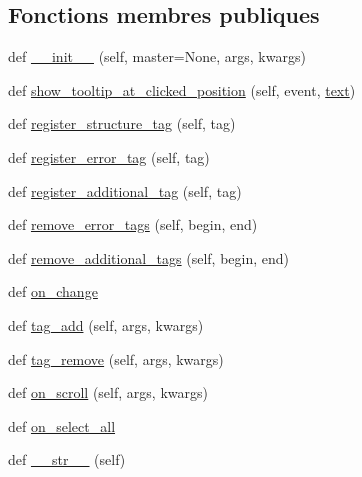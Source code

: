\subsection*{Fonctions membres publiques}
\begin{DoxyCompactItemize}
\item 
def \hyperlink{classtex__editor_1_1utils_1_1_special_text_ab5ce5add457b9d87567d9e406e0e0d7f}{\+\_\+\+\_\+init\+\_\+\+\_\+} (self, master=None, args, kwargs)
\item 
def \hyperlink{classtex__editor_1_1utils_1_1_special_text_ac86588cdecd42ba520da540c3b53054c}{show\+\_\+tooltip\+\_\+at\+\_\+clicked\+\_\+position} (self, event, \hyperlink{namespacetex__editor_1_1utils_ae4fa308d3c65a5223578baf4c1ec4ddd}{text})
\item 
def \hyperlink{classtex__editor_1_1utils_1_1_special_text_aa2c7f505584004c3a51503b561f88d93}{register\+\_\+structure\+\_\+tag} (self, tag)
\item 
def \hyperlink{classtex__editor_1_1utils_1_1_special_text_ac2a86818f880670a440941efe6aac1c3}{register\+\_\+error\+\_\+tag} (self, tag)
\item 
def \hyperlink{classtex__editor_1_1utils_1_1_special_text_aff461b778803c2006cc119f2b3423e7e}{register\+\_\+additional\+\_\+tag} (self, tag)
\item 
def \hyperlink{classtex__editor_1_1utils_1_1_special_text_ad05500b9af029430216d4d8e3ef8dd0c}{remove\+\_\+error\+\_\+tags} (self, begin, end)
\item 
def \hyperlink{classtex__editor_1_1utils_1_1_special_text_a0f84ca56d6989cc55461d13436dac299}{remove\+\_\+additional\+\_\+tags} (self, begin, end)
\item 
def \hyperlink{classtex__editor_1_1utils_1_1_special_text_a3a9a95544f83c8263b1282d4bdb4d24b}{on\+\_\+change}
\item 
def \hyperlink{classtex__editor_1_1utils_1_1_special_text_a8b33099c6026bdd806c3f899b104a670}{tag\+\_\+add} (self, args, kwargs)
\item 
def \hyperlink{classtex__editor_1_1utils_1_1_special_text_a8989286a4a84c502f21438d58cb3bf84}{tag\+\_\+remove} (self, args, kwargs)
\item 
def \hyperlink{classtex__editor_1_1utils_1_1_special_text_a8fe83b25bc52aa9240d159aed2081043}{on\+\_\+scroll} (self, args, kwargs)
\item 
def \hyperlink{classtex__editor_1_1utils_1_1_special_text_adbc4b27e8f31501bee76441b209612e0}{on\+\_\+select\+\_\+all}
\item 
def \hyperlink{classtex__editor_1_1utils_1_1_special_text_adda1583e7a0fea7dd4f1c5a13ad1cbf3}{\+\_\+\+\_\+str\+\_\+\+\_\+} (self)

\end{DoxyCompactItemize}
